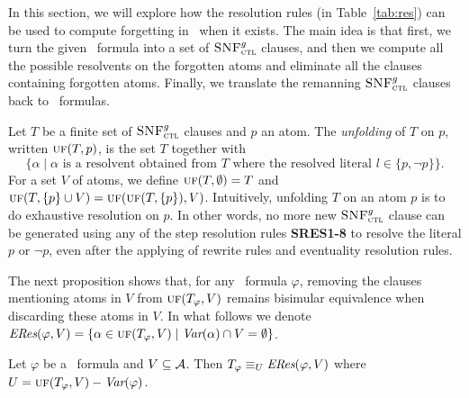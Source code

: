 \documentclass[twoside,11pt]{article}
\begin{document}
%
%
In this section, we will explore how the resolution rules (in Table~\ref{tab:res}) can be used to compute forgetting in \CTL\ when it exists. The main idea  is that first, we turn the given \CTL\ formula into a set of ${\textsc{SNF}_{\textsc{ctl}}^g}$ clauses, and then we compute all the possible resolvents on the forgotten atoms and eliminate all the clauses containing forgotten  atoms.
Finally, we translate the remanning ${\textsc{SNF}_{\textsc{ctl}}^g}$ clauses  back to \CTL\ formulas.

Let $T$ be a finite set of ${\textsc{SNF}_{\textsc{ctl}}^g}$ clauses and $p$ an atom.   The {\em unfolding} of $T$ on $p$, written
$\textsc{uf}(T,p)$, is the set $T$ together with
\[\{\alpha\mid \mbox{$\alpha$ is a resolvent obtained from $T$ where the resolved literal $l\in\{p,\neg p\}$}\}.  \]
For a set $V$ of atoms, we define $\textsc{uf}(T,\emptyset)=T$ and $\textsc{uf}(T,\{p\}\cup V)=\textsc{uf}(\textsc{uf}(T,\{p\}), V)$.
Intuitively, unfolding $T$ on an atom $p$ is to do exhaustive resolution on $p$. In other words,
no more new ${\textsc{SNF}_{\textsc{ctl}}^g}$ clause can be generated using any of the step resolution rules {\bf SRES1-8} to resolve the literal $p$ or $\neg p$, even
after the applying of rewrite rules and eventuality resolution rules.


The next proposition shows that, for any \CTL\ formula $\varphi$,
removing the clauses mentioning atoms in $V$ from $\textsc{uf}(T_\varphi,V)$ remains bisimular equivalence when discarding
these atoms in $V$.
In what follows we denote $\emph{ERes}(\varphi,V) = \{\alpha\in \textsc{uf}(T_\varphi,V)\mid \textit{Var}(\alpha)\cap V=\emptyset\}$.
\begin{proposition}
  Let $\varphi$ be a \CTL\ formula and $V\subseteq\cal A$. Then
  $T_\varphi \equiv_U\emph{ERes}(\varphi,V)$ where  $U=\textsc{uf}(T_\varphi,V)-\textit{Var}(\varphi)$.
\end{proposition}
\end{document}
